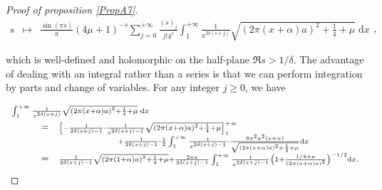 \documentclass{jams-l}
\theoremstyle{definition}
\theoremstyle{remark}
\numberwithin{equation}{section}
\begin{document}
\begin{proof}[Proof of proposition \ref{PropA7}]
                \[ \begin{array}{lll}
                        s & \longmapsto & \frac{\sin \left( \pi s \right)}{\pi} \left( 4 \mu + 1 \right)^{-s} \sum\limits_{j = 0}^{+ \infty} \frac{\left( s \right)_j}{j! 4^j} \int_1^{+ \infty} \frac{1}{x^{2 \delta \left( s+j \right)}} \sqrt{\left( 2 \pi \left( x + \alpha \right) a \right)^2 + \frac{1}{4} + \mu} \; \mathrm{d}x
                    \end{array} , \]
                
                \noindent which is well-defined and holomorphic on the half-plane $\Re s > 1 / \delta$. The advantage of dealing with an integral rather than a series is that we can perform integration by parts and change of variables. For any integer $j \geqslant 0$, we have
                
                \[ \begin{array}{lll}
                        \multicolumn{3}{l}{\scriptstyle \int_1^{+ \infty} \frac{1}{x^{2 \delta \left( s+j \right)}} \sqrt{\left( 2 \pi \left( x + \alpha \right) a \right)^2 + \frac{1}{4} + \mu} \; \mathrm{d}x} \\[0.5em]
                        
                        \qquad & = & \scriptstyle \left[ - \frac{1}{2 \delta \left( s + j \right) - 1} \cdot \frac{1}{x^{2 \delta \left( s + j \right) - 1}} \sqrt{\left( 2 \pi \left( x + \alpha \right) a \right)^2 + \frac{1}{4} + \mu} \right]_{1}^{+ \infty} \\[0.em]
                        
                        && \qquad \qquad \qquad \scriptstyle + \frac{1}{2 \delta \left( s + j \right) - 1} \cdot \frac{1}{2} \int_1^{+ \infty} \frac{1}{x^{2 \delta \left( s + j \right) - 1}} \cdot \frac{8 \pi^2 a^2 \left( x + \alpha \right)}{\sqrt{\left( 2 \pi \left( x + \alpha \right) a \right)^2 + \frac{1}{4} + \mu}} \mathrm{d}x \\[0.5em]
                        
                        & = & \scriptstyle \frac{1}{2 \delta \left( s + j \right) - 1} \sqrt{\left( 2 \pi \left( 1 + \alpha \right) a \right)^2 + \frac{1}{4} + \mu} + \frac{2 \pi a}{2 \delta \left( s + j \right) - 1} \int_1^{+ \infty} \frac{1}{x^{2 \delta \left( s + j \right) - 1}} \left( 1 + \frac{1/4 + \mu}{\left( 2 \pi \left( x + \alpha \right) a \right)^2} \right)^{-1/2} \mathrm{d}x.
                    \end{array} \]
                

\end{proof}
\end{document}
